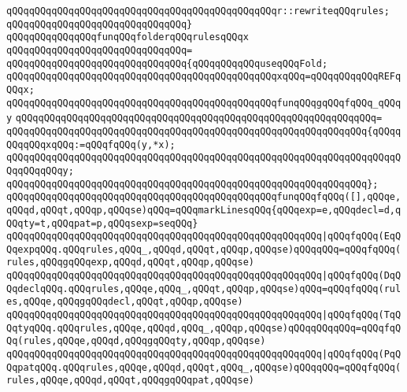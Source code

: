 \newline
\verb|qQQqqQQqqQQqqQQqqQQqqQQqqQQqqQQqqQQqqQQqqQQqqQQqr::rewriteqQQqrules;|\newline
\verb|qQQqqQQqqQQqqQQqqQQqqQQqqQQqqQQq}|\newline
\newline
\newline
\verb|qQQqqQQqqQQqqQQqfunqQQqfolderqQQqrulesqQQqx|\newline
\verb|qQQqqQQqqQQqqQQqqQQqqQQqqQQqqQQq=|\newline
\verb|qQQqqQQqqQQqqQQqqQQqqQQqqQQqqQQq{qQQqqQQqqQQquseqQQqFold;|\newline
\newline
\verb|qQQqqQQqqQQqqQQqqQQqqQQqqQQqqQQqqQQqqQQqqQQqqQQqxqQQq=qQQqqQQqqQQqREFqQQqx;|\newline
\newline
\verb|qQQqqQQqqQQqqQQqqQQqqQQqqQQqqQQqqQQqqQQqqQQqqQQqfunqQQqgqQQqfqQQq_qQQqy|\newline
\verb|qQQqqQQqqQQqqQQqqQQqqQQqqQQqqQQqqQQqqQQqqQQqqQQqqQQqqQQqqQQqqQQq=|\newline
\verb|qQQqqQQqqQQqqQQqqQQqqQQqqQQqqQQqqQQqqQQqqQQqqQQqqQQqqQQqqQQqqQQq{qQQqqQQqqQQqxqQQq:=qQQqfqQQq(y,*x);|\newline
\verb|qQQqqQQqqQQqqQQqqQQqqQQqqQQqqQQqqQQqqQQqqQQqqQQqqQQqqQQqqQQqqQQqqQQqqQQqqQQqqQQqy;|\newline
\verb|qQQqqQQqqQQqqQQqqQQqqQQqqQQqqQQqqQQqqQQqqQQqqQQqqQQqqQQqqQQqqQQq};|\newline
\newline
\verb|qQQqqQQqqQQqqQQqqQQqqQQqqQQqqQQqqQQqqQQqqQQqqQQqfunqQQqfqQQq([],qQQqe,qQQqd,qQQqt,qQQqp,qQQqse)qQQq=qQQqmarkLinesqQQq{qQQqexp=e,qQQqdecl=d,qQQqty=t,qQQqpat=p,qQQqsexp=seqQQq}|\newline
\verb|qQQqqQQqqQQqqQQqqQQqqQQqqQQqqQQqqQQqqQQqqQQqqQQqqQQqqQQq|\verb#|qQQqfqQQq(EqQQqexpqQQq.qQQqrules,qQQq_,qQQqd,qQQqt,qQQqp,qQQqse)qQQqqQQq=qQQqfqQQq(rules,qQQqgqQQqexp,qQQqd,qQQqt,qQQqp,qQQqse)#\newline
\verb|qQQqqQQqqQQqqQQqqQQqqQQqqQQqqQQqqQQqqQQqqQQqqQQqqQQqqQQq|\verb#|qQQqfqQQq(DqQQqdeclqQQq.qQQqrules,qQQqe,qQQq_,qQQqt,qQQqp,qQQqse)qQQq=qQQqfqQQq(rules,qQQqe,qQQqgqQQqdecl,qQQqt,qQQqp,qQQqse)#\newline
\verb|qQQqqQQqqQQqqQQqqQQqqQQqqQQqqQQqqQQqqQQqqQQqqQQqqQQqqQQq|\verb#|qQQqfqQQq(TqQQqtyqQQq.qQQqrules,qQQqe,qQQqd,qQQq_,qQQqp,qQQqse)qQQqqQQqqQQq=qQQqfqQQq(rules,qQQqe,qQQqd,qQQqgqQQqty,qQQqp,qQQqse)#\newline
\verb|qQQqqQQqqQQqqQQqqQQqqQQqqQQqqQQqqQQqqQQqqQQqqQQqqQQqqQQq|\verb#|qQQqfqQQq(PqQQqpatqQQq.qQQqrules,qQQqe,qQQqd,qQQqt,qQQq_,qQQqse)qQQqqQQq=qQQqfqQQq(rules,qQQqe,qQQqd,qQQqt,qQQqgqQQqpat,qQQqse)#\newline

